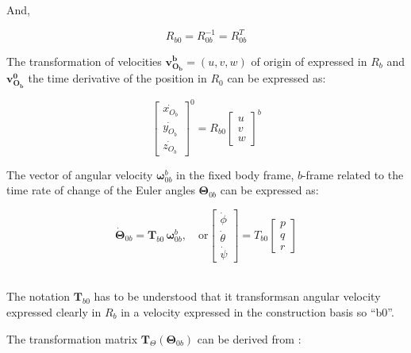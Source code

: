 \documentclass{article}
\begin{document}
And, 

\begin{equation}
 R_{b0} =  R_{0b}^{-1} =R_{0b}^{T}
\end{equation} \label{}

The transformation of velocities $\mathbf{v^b_{O_b}}=(u,v,w)$ of origin of expressed in $R_b$  and $\mathbf{v^0_{O_b}}$ the time derivative of the position in $R_0$  can be expressed as:

\begin{equation}
\begin{bmatrix}
\dot{x_{O_b}} \\
\dot{y_{O_b}} \\
\dot{z_{O_b}}
\end{bmatrix}^0 
=
 R_{b0} 
\begin{bmatrix}
u \\
v \\
w
\end{bmatrix}^b 
\end{equation}


The vector of angular velocity $\mathbf{\omega}_{0b}^b$ in the fixed body frame, $b$-frame related to the time rate of change of the Euler angles $\mathbf{\Theta}_{0b}$ can be expressed as:

\begin{equation}
\dot{\mathbf{\Theta}}_{0b} = \mathbf{T}_{b0} \,  \mathbf{\omega}_{0b}^b,
\quad \text{or}
\begin{bmatrix}
\dot{\phi} \\
\dot{\theta} \\
\dot{\psi}
\end{bmatrix} 
=  T_{b0}
\begin{bmatrix}
p \\
q \\
r
\end{bmatrix} 
\end{equation}\

The notation  $\mathbf{T}_{b0}$ has to be understood that it transformsan angular velocity expressed clearly in $R_b$ in a velocity expressed in the construction basis so ``b0''.

The transformation matrix $\textbf{T}_{\Theta} (\mathbf{\Theta}_{0b})$ can be derived from \cite{Fossen}:
\end{document}
